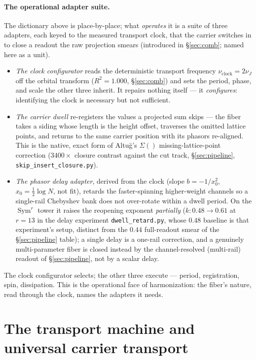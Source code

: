 \documentclass[11pt]{article}
\theoremstyle{definition}
\newcommand{\Sym}{\operatorname{Sym}}
\begin{document}
\paragraph{The operational adapter suite.} The dictionary above is place-by-place; what \emph{operates} it is a
suite of three adapters, each keyed to the measured transport clock, that the carrier switches in to close a
readout the raw projection smears (introduced in \S\ref{sec:comb}; named here as a unit).
\begin{itemize}
\item[\textup{(1)}] \emph{The clock configurator} reads the deterministic transport frequency
$\nu_{\mathrm{clock}}=2\nu_J$ off the orbital transform ($R^2=1.000$, \S\ref{sec:comb}) and sets the period,
phase, and scale the other three inherit. It repairs nothing itself --- it \emph{configures}: identifying the
clock is necessary but not sufficient.
\item[\textup{(2)}] \emph{The carrier dwell} re-registers the values a projected sum skips --- the fiber takes a
siding whose length is the height offset, traverses the omitted lattice points, and returns to the same carrier
position with its phasors re-aligned. This is the native, exact form of Altu\u{g}'s $\Sigma()$
missing-lattice-point correction ($3400\times$ closure contrast against the cut track, \S\ref{sec:pipeline},
\texttt{skip\_insert\_closure.py}).
\item[\textup{(3)}] \emph{The phasor delay adapter}, derived from the clock (slope $b=-1/x_0^2$, $x_0=\tfrac12
\log N$, not fit), retards the faster-spinning higher-weight channels so a single-rail Chebyshev bank does not
over-rotate within a dwell period. On the $\Sym^r$ tower it raises the reopening exponent \emph{partially}
($k\colon0.48\to0.61$ at $r=13$ in the delay experiment \texttt{dwell\_retard.py}, whose $0.48$ baseline is that
experiment's setup, distinct from the $0.44$ full-readout smear of the \S\ref{sec:pipeline} table); a single
delay is a one-rail correction, and a
genuinely multi-parameter fiber is closed instead by the channel-resolved (multi-rail) readout of
\S\ref{sec:pipeline}, not by a scalar delay.
\end{itemize}
The clock configurator selects; the other three execute --- period, registration, spin, dissipation. This is the
operational face of harmonization: the fiber's nature, read through the clock, names the adapters it needs.

\section{The transport machine and universal carrier transport}\label{sec:transport-machine}
\end{document}
